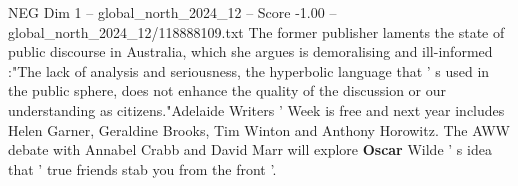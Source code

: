 \begin{textsample}{NEG Dim 1 – global\_north\_2024\_12 – Score -1.00 – global\_north\_2024\_12/118888109.txt}
The former publisher laments the state of public discourse in Australia, which she argues is demoralising and ill-informed :"The lack of analysis and seriousness, the hyperbolic language that ' s used in the public sphere, does not enhance the quality of the discussion or our understanding as citizens."Adelaide Writers ' Week is free and next year includes Helen Garner, Geraldine Brooks, Tim Winton and Anthony Horowitz.
The AWW debate with Annabel Crabb and David Marr will explore \textbf{Oscar} Wilde ' s idea that ' true friends stab you from the front '.

\end{textsample}
